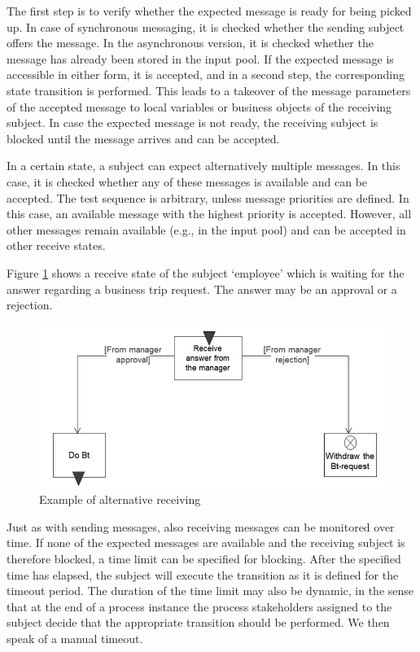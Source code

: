The first step is to verify whether the expected message is ready for being picked up. In case of synchronous messaging, it is checked whether the sending subject offers the message. In the asynchronous version, it is checked whether the message has already been stored in the input pool. If the expected message is accessible in either form, it is accepted, and in a second step, the corresponding state transition is performed. This leads to a takeover of the message parameters of the accepted message to local variables or business objects of the receiving subject. In case the expected message is not ready, the receiving subject is blocked until the message arrives and can be accepted.

In a certain state, a subject can expect alternatively multiple messages. In this case, it is checked whether any of these messages is available and can be accepted. The test sequence is arbitrary, unless message priorities are defined. In this case, an available message with the highest priority is accepted. However, all other messages remain available (e.g., in the input pool) and can be accepted in other receive states.

Figure \ref{fig:receivestate} shows a receive state of the subject ‘employee’ which is waiting for the answer regarding a business trip request. The answer may be an approval or a rejection.

\begin{figure}[ph]
	\centering
	\includegraphics[width=0.7\linewidth]{20181026-Ontologie-Bilder/Grafiken-Ontologie/SUbjectExecution/ReceiveState}
	\caption[Example of alternative receiving]{Example of alternative receiving}
	\label{fig:receivestate}
\end{figure}

Just as with sending messages, also receiving messages can be monitored over time. If none of the expected messages are available and the receiving subject is therefore blocked, a time limit can be specified for blocking. After the specified time has elapsed, the subject will execute the transition as it is defined for the timeout period. The duration of the time limit may also be dynamic, in the sense that at the end of a process instance the process stakeholders assigned to the subject decide that the appropriate transition should be performed. We then speak of a manual timeout.

